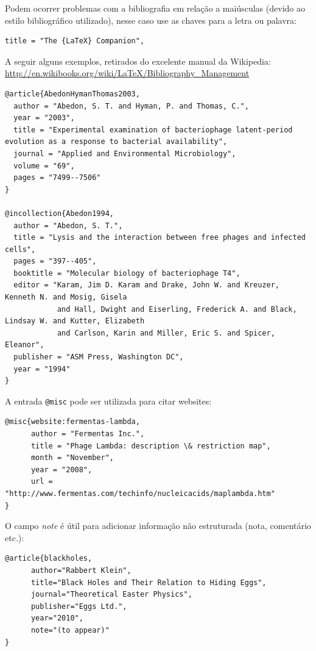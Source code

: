 Podem ocorrer problemas com a bibliografia em relação a maiúsculas (devido ao estilo bibliográfico utilizado), nesse caso use as chaves para a letra ou palavra:

\begin{verbatim}
title = "The {LaTeX} Companion",
\end{verbatim}

A seguir alguns exemplos, retirados do excelente manual da Wikipedia: \url{http://en.wikibooks.org/wiki/LaTeX/Bibliography_Management}

\begin{verbatim}
@article{AbedonHymanThomas2003,
  author = "Abedon, S. T. and Hyman, P. and Thomas, C.",
  year = "2003",
  title = "Experimental examination of bacteriophage latent-period evolution as a response to bacterial availability",
  journal = "Applied and Environmental Microbiology",
  volume = "69",
  pages = "7499--7506"
}

@incollection{Abedon1994,
  author = "Abedon, S. T.",
  title = "Lysis and the interaction between free phages and infected cells",
  pages = "397--405",
  booktitle = "Molecular biology of bacteriophage T4",
  editor = "Karam, Jim D. Karam and Drake, John W. and Kreuzer, Kenneth N. and Mosig, Gisela
            and Hall, Dwight and Eiserling, Frederick A. and Black, Lindsay W. and Kutter, Elizabeth
            and Carlson, Karin and Miller, Eric S. and Spicer, Eleanor",
  publisher = "ASM Press, Washington DC",
  year = "1994"
}
\end{verbatim}

A entrada \verb+@misc+ pode ser utilizada para citar websites:

\begin{verbatim}
@misc{website:fermentas-lambda,
      author = "Fermentas Inc.",
      title = "Phage Lambda: description \& restriction map",
      month = "November",
      year = "2008",
      url = "http://www.fermentas.com/techinfo/nucleicacids/maplambda.htm"
}
\end{verbatim}

O campo \textit{note} é útil para adicionar informação não estruturada (nota, comentário etc.):

\begin{verbatim}
@article{blackholes,
      author="Rabbert Klein",
      title="Black Holes and Their Relation to Hiding Eggs",
      journal="Theoretical Easter Physics",
      publisher="Eggs Ltd.",
      year="2010",
      note="(to appear)"
}
\end{verbatim}

